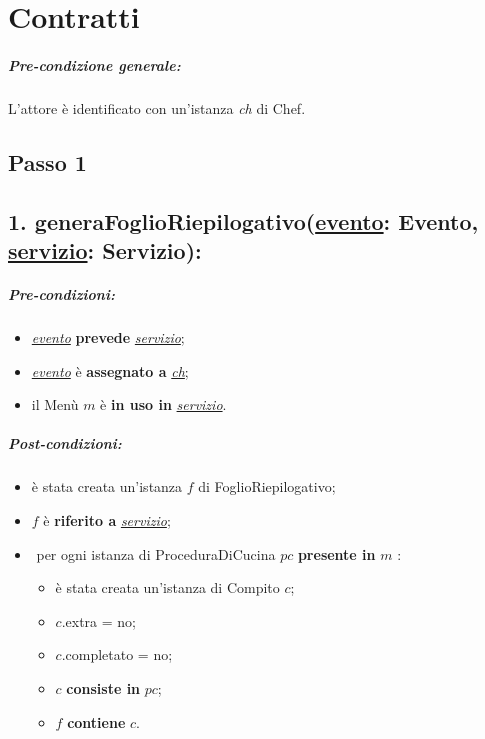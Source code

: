 \chapter{Contratti}

\paragraph{Pre-condizione generale:} L'attore è identificato con un'istanza \textit{ch} di Chef. 

\section{Passo 1}

\section*{1. generaFoglioRiepilogativo(\underline{evento}: Evento, \underline{servizio}: Servizio):}

\paragraph{Pre-condizioni:}

\begin{itemize}
  \item \underline{\textit{evento}} \textbf{prevede} \underline{\textit{servizio}};
  \item \underline{\textit{evento}} è \textbf{assegnato a} \underline{\textit{ch}};
  \item il Menù $m$ è \textbf{in uso in} \underline{\textit{servizio}}.
\end{itemize}

\paragraph{Post-condizioni:}

\begin{itemize}
    \item è stata creata un'istanza $f$ di FoglioRiepilogativo;
    \item $f$ è \textbf{riferito a} \underline{\textit{servizio}};
    \item \textlangle $ $ per ogni istanza di ProceduraDiCucina $pc$ \textbf{presente in} $m$ \textrangle:
    \begin{itemize}
        \item è stata creata un'istanza di Compito $c$;
        \item $c$.extra = no;
        \item $c$.completato = no;
        \item $c$ \textbf{consiste in} $pc$;
        \item $f$ \textbf{contiene} $c$.
    \end{itemize}
\end{itemize}

